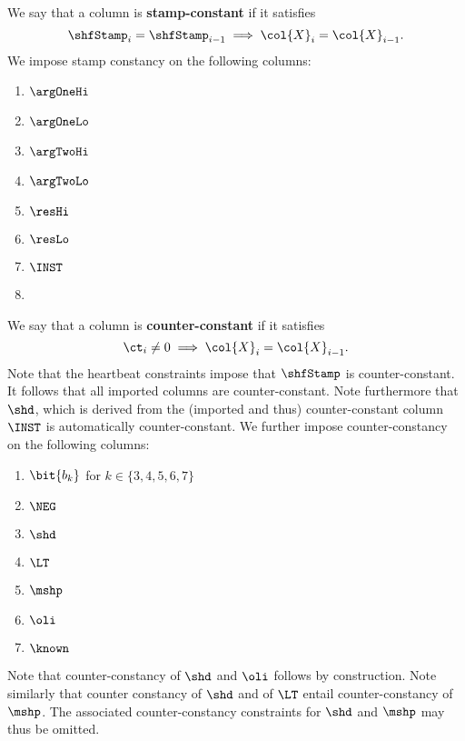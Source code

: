 We say that a column  is \textbf{stamp-constant} if it satisfies
\[
	\shfStamp_{i} = \shfStamp_{i-1} \implies \col{X}_{i} = \col{X}_{i - 1}.
\]
We impose stamp constancy on the following columns:
\begin{multicols}{4}
\begin{enumerate}
	\item $\argOneHi$
	\item $\argOneLo$
	\item $\argTwoHi$
	\item $\argTwoLo$
	\item $\resHi$
	\item $\resLo$
	\item $\INST$
	\item[\vspace{\fill}]
\end{enumerate}
\end{multicols}
\noindent We say that a column  is \textbf{counter-constant} if it satisfies
\[
	\ct_{i} \neq 0 \implies \col{X}_{i} = \col{X}_{i - 1}.
\]
Note that the heartbeat constraints impose that $\shfStamp$ is counter-constant. It follows that all imported columns are counter-constant. Note furthermore that $\shd$, which is derived from the (imported and thus) counter-constant column $\INST$ is automatically counter-constant. We further impose counter-constancy on the following columns:
\begin{multicols}{3}
\begin{enumerate}
	\item $\bit{b_{k}}$ for $k \in \{3, 4, 5, 6, 7\}$
	\item $\NEG$
	\item $\shd$
	\item $\LT$
	\item $\mshp$
	\item $\oli$
	\item $\known$
\end{enumerate}
\end{multicols}
Note that counter-constancy of $\shd$ and $\oli$ follows by construction. Note similarly that counter constancy of $\shd$ and of $\LT$ entail counter-constancy of $\mshp$. The associated counter-constancy constraints for $\shd$ and $\mshp$ may thus be omitted.
